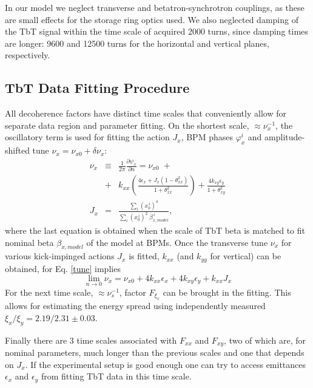 \documentclass[a4paper,
               keeplastbox,   %
               ]{jacow}
\begin{document}
In our model we neglect transverse and betatron-synchrotron couplings, as these are small effects for the storage ring optics used. We also neglected damping of the TbT signal within the time scale of acquired 2000 turns, since damping times are longer: 9600 and 12500 turns for the horizontal and vertical planes, respectively.

\subsection{TbT Data Fitting Procedure}

All decoherence factors have distinct time scales that conveniently allow for separate data region and parameter fitting. On the shortest scale, $\approx \nu^{-1}_x$, the oscillatory term is used for fitting the action $J_x$, BPM phases $\varphi^i_x$ and amplitude-shifted tune $\nu_x = \nu_{x0} + \delta\nu_x$:
\begin{eqnarray}
    \nu_x & \equiv & \frac{1}{2\pi} \frac{\partial \psi_x}{\partial n}  = \nu_{x0} \; + \nonumber \\
    \label{tune}
                & + & k_{xx} \left( \frac{4\epsilon_x + J_x (1 - \theta^{2}_{xx}) }{1 + \theta^{2}_{xx}} \right) + \frac{4 k_{xy} \epsilon_y}{1 + \theta^{2}_{xy}} \\
J_x & = & \frac{\sum_i{(x_0^{\,i})^{4}}}{\sum_i{(x_0^{\,i})^{2} \; \beta^{\,i}_{x,model} }}, 
\end{eqnarray}
where the last equation is obtained when the scale of TbT beta is matched to fit nominal beta $\beta_{x,model}$ of the model at BPMs. Once the transverse tune $\nu_x$ for various kick-impinged actions $J_x$ is fitted, $k_{xx}$ (and $k_{yy}$ for vertical) can be obtained, for Eq. \ref{tune} implies
\begin{equation}
    \lim_{n \to 0} \nu_x = \nu_{x0} + 4 k_{xx} \epsilon_x + 4 k_{xy} \epsilon_y + k_{xx} J_x
\end{equation}
For the next time scale, $\approx \nu^{-1}_s$, factor $F_{\xi_x}$ can be brought in the fitting. This allows for estimating the energy spread using independently measured $\xi_x/\xi_y = \num{2.19}/\num{2.31} \pm \num{0.03}$.

Finally there are 3 time scales associated with $F_{xx}$ and $F_{xy}$, two of which are, for nominal parameters, much longer than the previous scales and one that depends on $J_x$. If the experimental setup is good enough one can try to access emittances $\epsilon_x$ and $\epsilon_y$ from fitting TbT data in this time scale.
\end{document}
